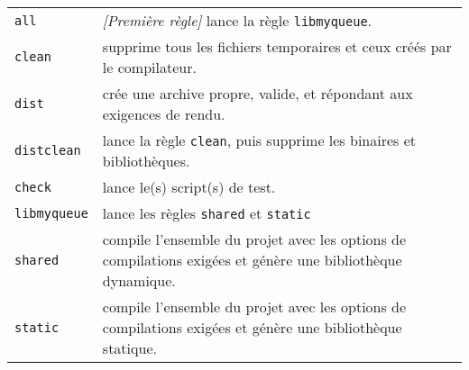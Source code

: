 \bigskip

\begin{tabular}{l p{13cm}}
\texttt{all} & \textit{[Première règle]} lance la règle \texttt{libmyqueue}.\\
\texttt{clean} & supprime tous les fichiers temporaires et ceux créés par le compilateur.\\
\texttt{dist} & crée une archive propre, valide, et répondant aux exigences de rendu.\\
\texttt{distclean} & lance la règle \texttt{clean}, puis supprime les binaires et bibliothèques.\\
\texttt{check} & lance le(s) script(s) de test.\\
\texttt{libmyqueue} & lance les règles \texttt{shared} et \texttt{static} \\
\texttt{shared} & compile l'ensemble du projet avec les options de compilations exigées et génère une bibliothèque dynamique.\\
\texttt{static} & compile l'ensemble du projet avec les options de compilations exigées et génère une bibliothèque statique.\\
\end{tabular}
